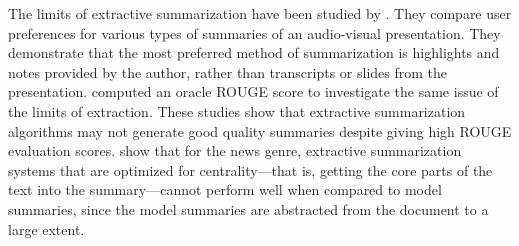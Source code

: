 The limits of extractive summarization have been studied by . They compare user preferences for various types of summaries of an audio-visual presentation. They demonstrate that the most preferred method of summarization is highlights and notes provided by the author, rather than transcripts or slides from the presentation.  computed an oracle ROUGE score to investigate the same issue of the limits of extraction. 
These studies show that extractive summarization algorithms may not generate good quality summaries despite giving high ROUGE evaluation scores.  show that for the news genre, extractive summarization systems that are optimized for centrality---that is, getting the core parts of the text into the summary---cannot perform well when compared to model summaries, since the model summaries are abstracted from the document to a large extent.

